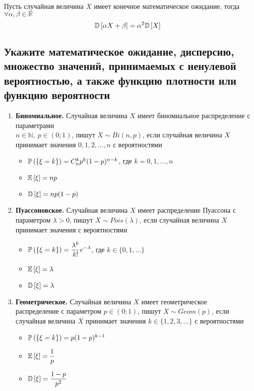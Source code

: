 \documentclass{article}
\begin{document}
\theorem Пусть случайная величина $X$ имеет конечное математическое ожидание, тогда $\forall \alpha,\beta\in\mathbb{R}$
\begin{equation*}
    \mathbb{D}\left[\alpha X+\beta\right]=\alpha^2\mathbb{D}\left[X\right]
\end{equation*}


\subsection{Укажите математическое ожидание, дисперсию, множество значений, принимаемых с ненулевой вероятностью, а также функцию плотности или функцию вероятности}
\begin{enumerate}
    \item \textbf{Биномиальное.} Случайная величина $X$ имеет биномиальное распределение с параметрами\\ $n\in\mathbb{N},\ p\in(0;1)$, пишут $X\sim Bi(n,p)$, если случайная величина $X$ принимает значения $0,1,2,\ldots,n$ с вероятностями 
    \begin{itemize}
        \item $\mathbb{P}\left(\{\xi=k\}\right)=C_n^k p^k (1-p)^{n-k}$, где $k=0,1,\ldots,n$
        \item $\mathbb{E}\left[\xi\right]=np$
        \item $\mathbb{D}\left[\xi\right]=np(1-p)$
    \end{itemize}
    \item \textbf{Пуассоновское.} Случайная величина $X$ имеет распределение Пуассона с параметром $\lambda>0$, пишут $X\sim Pois(\lambda)$, если случайная величина $X$ принимает значения с вероятностями
    \begin{itemize}
        \item $\mathbb{P}\left(\{\xi=k\}\right)=\displaystyle\frac{\lambda^k}{k!}e^{-\lambda}$, где $k\in\{0,1,\ldots\}$
        \item $\mathbb{E}\left[\xi\right]=\lambda$
        \item $\mathbb{D}\left[\xi\right]=\lambda$
    \end{itemize}
    \item \textbf{Геометрическое.} Случайная величина $X$ имеет геометрическое распределение с параметром $p\in(0;1)$, пишут $X\sim Geom(p)$, если случайная величина $X$ принимает значения $k\in\{1,2,3,\ldots\}$ с вероятностями
    \begin{itemize}
        \item $\mathbb{P}\left(\{\xi=k\}\right)=p(1-p)^{k-1}$
        \item $\mathbb{E}\left[\xi\right]=\displaystyle\frac{1}{p}$
        \item $\mathbb{D}\left[\xi\right]=\displaystyle\frac{1-p}{p^2}$

\end{itemize}
\end{enumerate}
\end{document}
